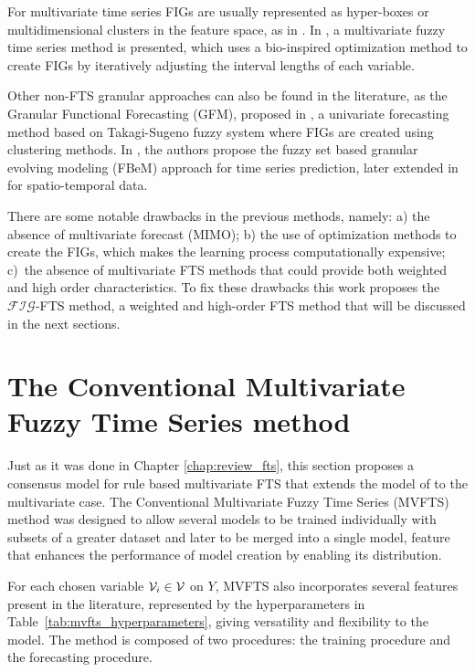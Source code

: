 For multivariate time series FIGs are usually represented as hyper-boxes or multidimensional clusters in the feature space, as in \cite{Reyes-Galaviz2016, Singh2018}.  In \cite{Singh2018},  a multivariate fuzzy time series method is presented, which uses a bio-inspired optimization method to create FIGs by iteratively adjusting the interval lengths of each variable.

Other non-FTS granular approaches can also be found in the literature, as the Granular Functional Forecasting (GFM), proposed in \cite{Magalhaes2008}, a univariate forecasting method based on Takagi-Sugeno fuzzy system where FIGs are created using clustering methods. In \cite{Leite2011}, the authors propose the fuzzy set  based  granular  evolving modeling (FBeM) approach for time series prediction, later extended in \cite{Soares2018} for spatio-temporal data.

There are some notable drawbacks in the previous methods, namely: a) the absence of multivariate forecast (MIMO); b) the use of optimization methods to create the FIGs, which makes the learning process computationally expensive; c)~the absence of multivariate FTS methods that could provide both weighted and high order characteristics. To fix these drawbacks this work proposes the $\mathcal{FIG}$-FTS method, a weighted and high-order FTS method that will be discussed in the next sections. 

\section{The Conventional Multivariate Fuzzy Time Series method}
\label{sec:mvfts}

Just as it was done in Chapter \ref{chap:review_fts}, this section proposes a consensus model for rule based multivariate FTS that extends the model of \cite{chen1996forecasting} to the multivariate case. The Conventional Multivariate Fuzzy Time Series (MVFTS) method was designed to allow several models to be trained individually with subsets of a greater dataset and later to be merged into a single model, feature that enhances the performance of model creation by enabling its distribution.

For each chosen variable $\mathcal{V}_i \in \mathcal{V}$ on $Y$, MVFTS also incorporates several features present in the literature, represented by the hyperparameters in Table~\ref{tab:mvfts_hyperparameters}, giving versatility and flexibility to the model. The method is composed of two procedures: the training procedure and the forecasting procedure.

